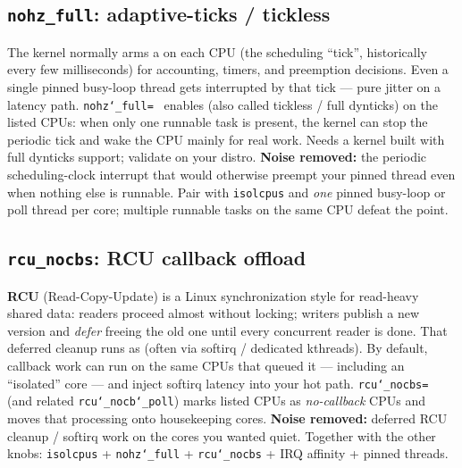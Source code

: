 \subsection{\texttt{nohz\_full}: adaptive-ticks / tickless}
\label{subsec:nohz-full}
The kernel normally arms a  on each CPU 
(the scheduling ``tick'', historically every few milliseconds) for accounting, 
timers, and preemption decisions. Even a single pinned busy-loop thread gets 
interrupted by that tick --- pure jitter on a latency path.
\newline
\texttt{nohz\char`_full=}~\cite{kernel-nohz} enables  
(also called tickless / full dynticks) on the listed CPUs: when only one runnable 
task is present, the kernel can stop the periodic tick and wake the CPU mainly 
for real work. Needs a kernel built with full dynticks support; validate on your distro.
\newline
\textbf{Noise removed:} the periodic scheduling-clock interrupt that would otherwise 
preempt your pinned thread even when nothing else is runnable.
\newline
Pair with \texttt{isolcpus} and \emph{one} pinned busy-loop or poll thread per core; 
multiple runnable tasks on the same CPU defeat the point.

\subsection{\texttt{rcu\_nocbs}: RCU callback offload}
\label{subsec:rcu-nocbs}
\textbf{RCU} (Read-Copy-Update) is a Linux synchronization style for read-heavy 
shared data: readers proceed almost without locking; writers publish a new version 
and \emph{defer} freeing the old one until every concurrent reader is done. 
That deferred cleanup runs as  (often via softirq / 
dedicated kthreads).
\newline
By default, callback work can run on the same CPUs that queued it --- including 
an ``isolated'' core --- and inject softirq latency into your hot path. 
\texttt{rcu\char`_nocbs=}~\cite{kernel-rcu} (and related 
\texttt{rcu\char`_nocb\char`_poll}) marks listed CPUs as \emph{no-callback} CPUs 
and moves that processing onto housekeeping cores.
\newline
\textbf{Noise removed:} deferred RCU cleanup / softirq work on the cores you 
wanted quiet.
\newline
Together with the other knobs: \texttt{isolcpus} + \texttt{nohz\char`_full} + 
\texttt{rcu\char`_nocbs} + IRQ affinity + pinned threads.

